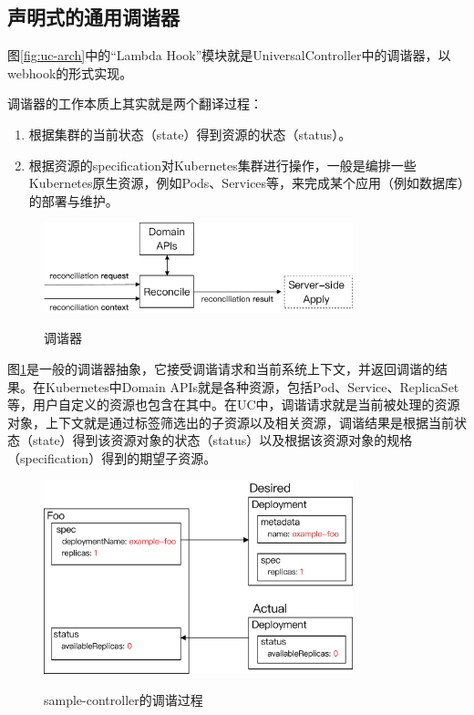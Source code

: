\documentclass[macfonts,master]{njuthesis}
\begin{document}
\subsection{声明式的通用调谐器}
图\ref{fig:uc-arch}中的``Lambda Hook''模块就是UniversalController中的调谐器，以webhook的形式实现。

调谐器的工作本质上其实就是两个翻译过程：
\begin{enumerate}
	\item 根据集群的当前状态（state）得到资源的状态（status）。
	\item 根据资源的specification对Kubernetes集群进行操作，一般是编排一些Kubernetes原生资源，例如Pods、Services等，来完成某个应用（例如数据库）的部署与维护。
\end{enumerate}

\begin{figure}[htbp]
  \centering
  \includegraphics[width= 0.8\textwidth]{pics/reconciler-interface.pdf}\\
  \caption{调谐器}\label{fig:reconciler}
\end{figure}

图\ref{fig:reconciler}是一般的调谐器抽象，它接受调谐请求和当前系统上下文，并返回调谐的结果。在Kubernetes中Domain APIs就是各种资源，包括Pod、Service、ReplicaSet等，用户自定义的资源也包含在其中。在UC中，调谐请求就是当前被处理的资源对象，上下文就是通过标签筛选出的子资源以及相关资源，调谐结果是根据当前状态（state）得到该资源对象的状态（status）以及根据该资源对象的规格（specification）得到的期望子资源。

\begin{figure}[htbp]
  \centering
  \includegraphics[width=0.8\textwidth]{pics/Foo-reconciliation.pdf}\\
  \caption{sample-controller的调谐过程}\label{fig:Foo-reconciliation}
\end{figure}
\end{document}
